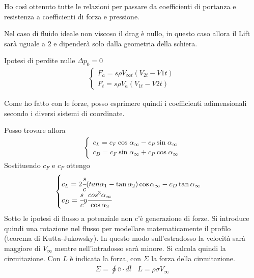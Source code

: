 Ho così ottenuto tutte le relazioni per passare da coefficienti di portanza e resistenza a coefficienti di forza e pressione.

Nel caso di fluido ideale non viscoso il drag è nullo, in questo caso allora il Lift sarà uguale a $2$ e dipenderà solo dalla geometria della schiera. 

Ipotesi di perdite nulle $\Delta p_0 = 0$
\begin{align*}
\begin{cases}
F_a = s \rho V_{\infty t} (V_{2t}-V{1t})\\
F_t = s \rho V_a (V_{1t}-V{2t})
\end{cases}
\end{align*}

Come ho fatto con le forze, posso esprimere quindi i coefficienti adimensionali secondo i diversi sistemi di coordinate. 

Posso trovare allora
\begin{align*}
\begin{cases}
c_L = c_F \cos \alpha_{\infty} - c_P \sin \alpha_{\infty} \\
c_D = c_F \sin \alpha_{\infty} + c_P \cos \alpha_{\infty}
\end{cases}
\end{align*}
Sostituendo $c_F$ e $c_P$ ottengo
\begin{align*}
\begin{cases}
c_L = 2 \cfrac{s}{c} (tan \alpha_1 - \tan \alpha_2) \cos \alpha_{\infty} - c_D \tan \alpha_{\infty} \\
c_D = \cfrac{s}{c} y \cfrac{cos^3 \alpha_{\infty}}{\cos \alpha_2}
\end{cases}
\end{align*}
Sotto le ipotesi di flusso a potenziale non c'è generazione di forze. Si introduce quindi una rotazione nel flusso per modellare matematicamente il profilo (teorema di Kutta-Jukowsky). In questo modo sull'estradosso la velocità sarà maggiore di $V_{\infty}$ mentre nell'intradosso sarà minore. Si calcola quindi la circuitazione. Con $L$ è indicata la forza, con $\Sigma$ la forza della circuitazione.
\begin{align*}
\Sigma = \oint \overline{v} \cdot d \overline{l} \;\;\; L = \rho \sigma V_{\infty}
\end{align*}

